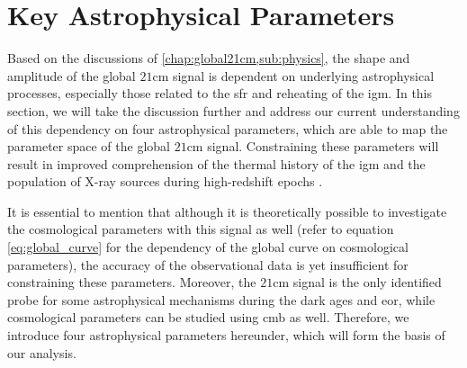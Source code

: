 \documentclass[12pt, TexShade, letterpaper]{report}
\begin{document}
\section{Key Astrophysical Parameters}
Based on the discussions of \ref{chap:global21cm,sub:physics}, the shape and amplitude of the global $\mathrm{21cm}$ signal is dependent on underlying astrophysical processes, especially those related to the \gls{sfr} and reheating of the \gls{igm}. In this section, we will take the discussion further and address our current understanding of this dependency on four astrophysical parameters, which are able to map the parameter space of the global $\mathrm{21cm}$ signal. Constraining these parameters will result in improved comprehension of the thermal history of the \gls{igm} and the population of X-ray sources during high-redshift epochs \cite{21century}.\par
It is essential to mention that although it is theoretically possible to investigate the cosmological parameters with this signal as well (refer to equation \ref{eq:global_curve} for the dependency of the global curve on cosmological parameters), the accuracy of the observational data is yet insufficient for constraining these parameters. Moreover, the $\mathrm{21cm}$ signal is the only identified probe for some astrophysical mechanisms during the dark ages and \gls{eor}, while cosmological parameters can be studied using \gls{cmb} as well. Therefore, we introduce four astrophysical parameters hereunder, which will form the basis of our analysis. \par
\end{document}

